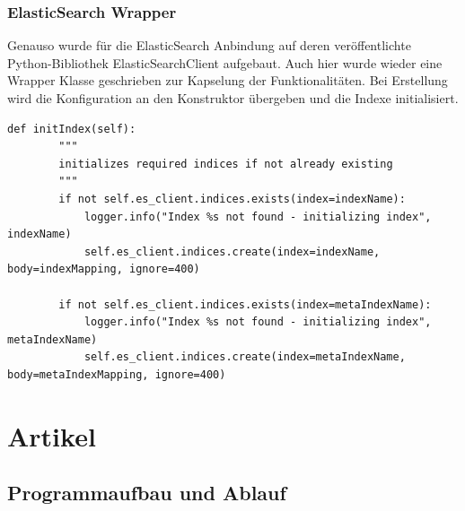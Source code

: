 \documentclass[12pt,oneside,a4paper,parskip]{scrbook}
\begin{document}
\subsubsection{ElasticSearch Wrapper}

Genauso wurde für die ElasticSearch Anbindung auf deren veröffentlichte Python-Bibliothek ElasticSearchClient aufgebaut. Auch hier wurde wieder eine Wrapper Klasse geschrieben zur Kapselung der Funktionalitäten. Bei Erstellung wird die Konfiguration an den Konstruktor übergeben und die Indexe initialisiert.

\begin{lstlisting}[caption=Initialisierung der Indexe]
    def initIndex(self):
        """
        initializes required indices if not already existing
        """
        if not self.es_client.indices.exists(index=indexName):
            logger.info("Index %s not found - initializing index", indexName)
            self.es_client.indices.create(index=indexName, body=indexMapping, ignore=400)

        if not self.es_client.indices.exists(index=metaIndexName):
            logger.info("Index %s not found - initializing index", metaIndexName)
            self.es_client.indices.create(index=metaIndexName, body=metaIndexMapping, ignore=400)
\end{lstlisting}
\pagebreak


\section{Artikel}


\subsection{Programmaufbau und Ablauf}
\end{document}
